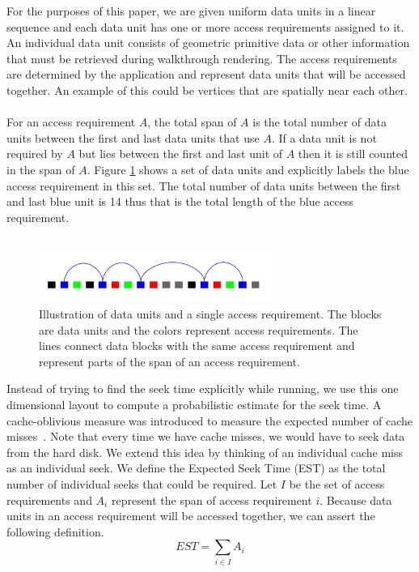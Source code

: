 \documentclass[conference]{acmsiggraph}
\begin{document}
For the purposes of this paper, we are given uniform data units in a linear sequence and each data unit has one or more access requirements assigned to it. An individual data unit consists of geometric primitive data or other information that must be retrieved during walkthrough rendering. The access requirements are determined by the application and represent data units that will be accessed together. An example of this could be vertices that are spatially near each other. \\
\\
For an access requirement $A$, the total span of $A$ is the total number of data units between the first and last data units that use $A$. If a data unit is not required by $A$ but lies between the first and last unit of $A$ then it is still counted in the span of $A$. Figure \ref{singleAR} shows a set of data units and explicitly labels the blue access requirement in this set. The total number of data units between the first and last blue unit is 14 thus that is the total length of the blue access requirement.\\
\\
\begin{figure}[ht]
\centering
\includegraphics[width=3in]{SingleAR_start.jpg}
\caption{Illustration of data units and a single access requirement. The blocks are data units and the colors represent access requirements. The lines connect data blocks with the same access requirement and represent parts of the span of an access requirement.}
\label{singleAR}
\end{figure}

Instead of trying to find the seek time explicitly while running, we use this one dimensional layout to compute a probabilistic estimate for the seek time. A cache-oblivious measure was introduced to measure the expected number of cache misses~\cite{cacheobliviouslayout}. Note that every time we have cache misses, we would have to seek data from the hard disk. We extend this idea by thinking of an individual cache miss as an individual seek. We define the Expected Seek Time (EST) as the total number of individual seeks that could be required. Let $I$ be the set of access requirements and $A_i$ represent the span of access requirement $i$. Because data units in an access requirement will be accessed together, we can assert the following definition. 
\[
EST = \sum_{i \in I} A_i
\]
\end{document}
